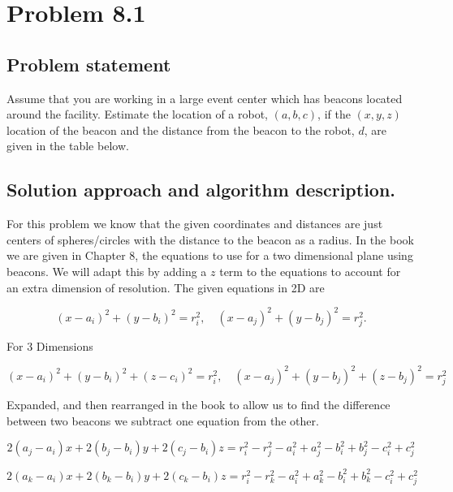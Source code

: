 \documentclass[letterpaper,11pt]{texMemo} %
\begin{document}
\maketitle %


\section*{Problem 8.1}
\subsection*{Problem statement}
Assume that you are working in a large event center which has beacons located around the 
facility. Estimate the location of a robot, $(a,b,c)$, if the $(x,y,z)$ location of the beacon 
and the distance from the beacon to the robot, $d$, are given in the table below.


\subsection*{Solution approach and algorithm description.}

For this problem we know that the given coordinates and distances are just centers of spheres/circles with
the distance to the beacon as a radius. In the book we are given in Chapter 8, the equations to use for a
two dimensional plane using beacons. We will adapt this by adding a $z$ term to the equations to account for
an extra dimension of resolution. The given equations in 2D are

\[
    (x-a_i)^2 + (y-b_i)^2 = r_i^2 , \quad (x-a_j)^2 + (y-b_j)^2 = r_j^2 .
\]

For 3 Dimensions

\[
    (x-a_i)^2 + (y-b_i)^2 +(z-c_i)^2 = r_i^2 , \quad (x-a_j)^2 + (y-b_j)^2 + (z-b_j)^2 = r_j^2
\]

Expanded, and then rearranged in the book to allow us to find the difference between two beacons
we subtract one equation from the other.

\[
    2(a_j-a_i)x + 2(b_j-b_i)y + 2(c_j-b_i)z  = r_i^2 - r_j^2 - a_i^2 + a_j^2 - b_i^2 + b_j^2 - c_i^2 + c_j^2
\]

\[
    2(a_k-a_i)x + 2(b_k-b_i)y + 2(c_k-b_i)z = r_i^2 - r_k^2  - a_i^2 + a_k^2 - b_i^2  + b_k^2 - c_i^2 + c_j^2
\]
\end{document}
